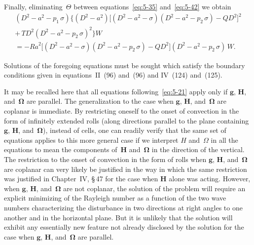 Finally, eliminating~$\Theta$ between equations~\eqref{eq:5-35}
and~\eqref{eq:5-42} we obtain
\begin{multline}
  (D^{2}\!-\!a^{2}\!-\!p_1\,\sigma)
  \bigl\{(D^{2}\!-\!a^{2})
    \bigl[(D^{2}\!-\!a^{2}\!-\!\sigma)(D^{2}\!-\!a^{2}\!-\!p_2\,\sigma)
      -QD^{2}\bigr]^{2} \\
  +\,T D^{2}(D^{2}\!-\!a^{2}\!-\!p_2\,\sigma)^{2}\bigr\}W \\
  = -\mathit{Ra}^{2}
    \bigl[(D^{2}\!-\!a^{2}\!-\!\sigma)(D^{2}\!-\!a^{2}\!-\!p_2\,\sigma)
    -QD^{2}\bigr]
    (D^{2}\!-\!a^{2}\!-\!p_2\,\sigma)\,W.
  \label{eq:5-43}
\end{multline}

Solutions of the foregoing equations must be sought which satisfy the
boundary conditions given in equations~II~(96) and~(96) and IV~(124)
and~(125).

It may be recalled here that all equations following~\eqref{eq:5-21} apply only if
$\mathbf{g}$, $\mathbf{H}$, and~$\boldsymbol{\Omega}$ are parallel.  The
generalization to the case when $\mathbf{g}$, $\mathbf{H}$,
and~$\boldsymbol{\Omega}$ are coplanar is immediate.  By restricting oneself
to the onset of convection in the form of infinitely extended rolls (along
directions parallel to the plane containing $\mathbf{g}$, $\mathbf{H}$,
and~$\boldsymbol{\Omega}$), instead of cells, one can readily verify that the
same set of equations applies to this more general case if we interpret $H$
and~$\Omega$ in all the equations to mean the components of~$\mathbf{H}$
and~$\boldsymbol{\Omega}$ in the direction of the vertical.  The restriction
to the onset of convection in the form of rolls when $\mathbf{g}$,
$\mathbf{H}$, and~$\boldsymbol{\Omega}$ are coplanar can very likely be
justified in the way in which the same restriction was justified in
Chapter~IV, \S\,47 for the case when $\mathbf{H}$ alone was acting.
However, when $\mathbf{g}$, $\mathbf{H}$, and~$\boldsymbol{\Omega}$ are not
coplanar, the solution of the problem will require an explicit minimizing of
the Rayleigh number as a function of the two wave numbers characterizing the
disturbance in two directions at right angles to one another and in the
horizontal plane.  But it is unlikely that the solution will exhibit any
essentially new feature not already disclosed by the solution for the case
when $\mathbf{g}$, $\mathbf{H}$, and~$\boldsymbol{\Omega}$ are parallel.

